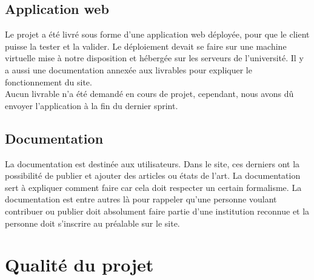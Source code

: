 \documentclass[t, 12pt, usenames,dvipsnames]{article}
\begin{document}
        \subsection{Application web}
            \noindent Le projet a été livré sous forme d'une application web déployée, pour que le client puisse la tester et la valider. Le déploiement devait se faire sur une machine virtuelle mise à notre disposition et hébergée sur les serveurs de l'université. Il y a aussi une documentation annexée aux livrables pour expliquer le fonctionnement du site.\\
            Aucun livrable n'a été demandé en cours de projet, cependant, nous avons dû envoyer l'application à la fin du dernier sprint.
        
        \subsection{Documentation}
            \noindent La documentation est destinée aux utilisateurs. Dans le site, ces derniers ont la possibilité de publier et ajouter des articles ou états de l'art. La documentation sert à expliquer comment faire car cela doit respecter un certain formalisme. La documentation est entre autres là pour rappeler qu'une personne voulant contribuer ou publier doit absolument faire partie d'une institution reconnue et la personne doit s'inscrire au préalable sur le site.

    \section{Qualité du projet}
        
\end{document}
